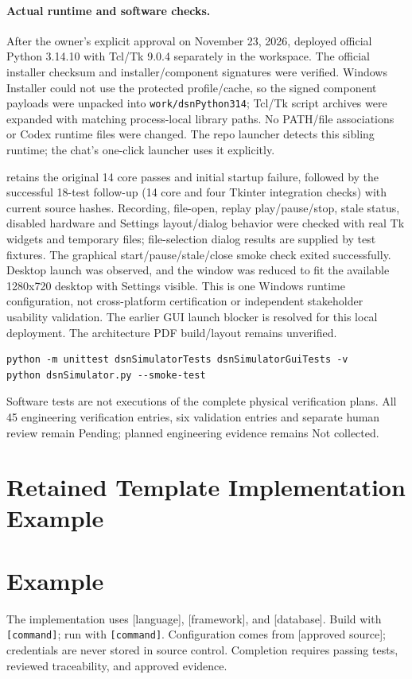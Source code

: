 \paragraph{Actual runtime and software checks.}
After the owner's explicit approval on November 23, 2026, deployed official
Python 3.14.10 with Tcl/Tk 9.0.4 separately in the workspace. The official
installer checksum and installer/component signatures were verified. Windows
Installer could not use the protected profile/cache, so the signed component
payloads were unpacked into \texttt{work/dsnPython314}; Tcl/Tk script archives
were expanded with matching process-local library paths. No PATH/file
associations or Codex runtime files were changed. The repo launcher detects
this sibling runtime; the chat's one-click launcher uses it explicitly.

 retains the original 14 core passes and
initial startup failure, followed by the successful 18-test follow-up (14 core
and four Tkinter integration checks) with current source hashes. Recording,
file-open, replay play/pause/stop, stale status, disabled hardware and Settings
layout/dialog behavior were checked with real Tk widgets and temporary files;
file-selection dialog results are supplied by test fixtures. The graphical
start/pause/stale/close smoke check exited successfully. Desktop launch was
observed, and the window was reduced to fit the available 1280x720 desktop
with Settings visible. This is one Windows runtime configuration, not
cross-platform certification or independent stakeholder usability validation.
The earlier GUI launch blocker is resolved for this local deployment.
The architecture PDF build/layout remains unverified.

\begin{verbatim}
python -m unittest dsnSimulatorTests dsnSimulatorGuiTests -v
python dsnSimulator.py --smoke-test
\end{verbatim}
Software tests are not executions of the complete physical verification plans.
All 45 engineering verification entries, six validation entries and separate
human review remain Pending; planned engineering evidence remains Not collected.

\section{Retained Template Implementation Example}
\section{Example}
The implementation uses [language], [framework], and [database]. Build with \texttt{[command]}; run with \texttt{[command]}. Configuration comes from [approved source]; credentials are never stored in source control. Completion requires passing tests, reviewed traceability, and approved evidence.
